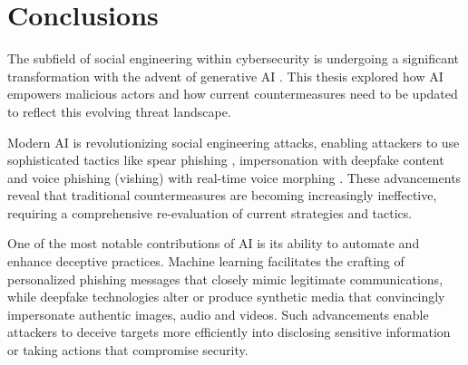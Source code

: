 


\chapter{Conclusions\label{chapter:conclusions}}
\begin{comment}

What to cover:
    - How AI has augmented SE attacks and countermeasures
    - Gap in the literature regarding SE and AI intersection?
    - Analysis on where AI-powered SE attacks might be headed in the future
        - Also about robotics and human-like actors
    - What organizations and individuals need to do regarding the evolving landscape of SE attacks
    
From training material:
    - "Yhteenveto vaatimattomimmillaan on vain lyhyt kertaus kirjoituksen keskeisistä asioista. Arvokkaamman yhteenvedon saa aikaan kommentoimalla työn tulosten arvoa, työn liittymistä ympäristöön ja tulevaisuudennäkymiä. Tällaiset arviot huolellisesti perusteltava."
    - "Yhteenvetoluku kuvaa teknisten johtopäätösten tuomaa impaktia."

\end{comment}

The subfield of social engineering within cybersecurity is undergoing a significant transformation with the advent of generative AI \citep{fakhouri_AI_Driven_Solutions_SE_Attacks_2024}. This thesis explored how AI empowers malicious actors and how current countermeasures need to be updated to reflect this evolving threat landscape.

Modern AI is revolutionizing social engineering attacks, enabling attackers to use sophisticated tactics like spear phishing \citep{basit_Comprehensive_Survey_AI_Phishing_Detection_2021}, impersonation with deepfake content \citep{mirsky_Creation_Detection_Deepfakes_2021} and voice phishing (vishing) with real-time voice morphing \citep{doan_BTSE_Audio_Deepfake_Detection_2023}. These advancements reveal that traditional countermeasures are becoming increasingly ineffective, requiring a comprehensive re-evaluation of current strategies and tactics.

One of the most notable contributions of AI is its ability to automate and enhance deceptive practices. Machine learning facilitates the crafting of personalized phishing messages that closely mimic legitimate communications, while deepfake technologies alter or produce synthetic media that convincingly impersonate authentic images, audio and videos. Such advancements enable attackers to deceive targets more efficiently into disclosing sensitive information or taking actions that compromise security.

